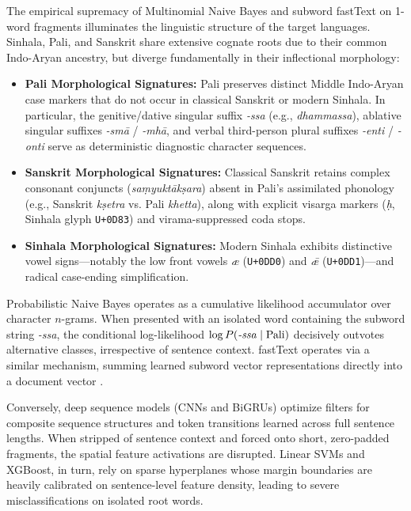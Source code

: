 \documentclass[11pt]{article}
\begin{document}
The empirical supremacy of Multinomial Naive Bayes and subword fastText on 1-word fragments illuminates the linguistic structure of the target languages. Sinhala, Pali, and Sanskrit share extensive cognate roots due to their common Indo-Aryan ancestry, but diverge fundamentally in their inflectional morphology:
\begin{itemize}
    \item \textbf{Pali Morphological Signatures:} Pali preserves distinct Middle Indo-Aryan case markers that do not occur in classical Sanskrit or modern Sinhala. In particular, the genitive/dative singular suffix \textit{-ssa} (e.g., \textit{dhammassa}), ablative singular suffixes \textit{-smā} / \textit{-mhā}, and verbal third-person plural suffixes \textit{-enti} / \textit{-onti} serve as deterministic diagnostic character sequences.
    \item \textbf{Sanskrit Morphological Signatures:} Classical Sanskrit retains complex consonant conjuncts (\textit{saṃyuktākṣara}) absent in Pali's assimilated phonology (e.g., Sanskrit \textit{kṣetra} vs. Pali \textit{khetta}), along with explicit visarga markers (\textit{ḥ}, Sinhala glyph \texttt{U+0D83}) and virama-suppressed coda stops.
    \item \textbf{Sinhala Morphological Signatures:} Modern Sinhala exhibits distinctive vowel signs—notably the low front vowels \textit{æ} (\texttt{U+0DD0}) and \textit{ǣ} (\texttt{U+0DD1})—and radical case-ending simplification.
\end{itemize}

Probabilistic Naive Bayes operates as a cumulative likelihood accumulator over character $n$-grams. When presented with an isolated word containing the subword string \textit{-ssa}, the conditional log-likelihood $\log P(\text{\textit{-ssa}} \mid \text{Pali})$ decisively outvotes alternative classes, irrespective of sentence context. fastText operates via a similar mechanism, summing learned subword vector representations directly into a document vector \cite{mikolov2013distributed}.

Conversely, deep sequence models (CNNs and BiGRUs) optimize filters for composite sequence structures and token transitions learned across full sentence lengths. When stripped of sentence context and forced onto short, zero-padded fragments, the spatial feature activations are disrupted. Linear SVMs and XGBoost, in turn, rely on sparse hyperplanes whose margin boundaries are heavily calibrated on sentence-level feature density, leading to severe misclassifications on isolated root words.
\end{document}
